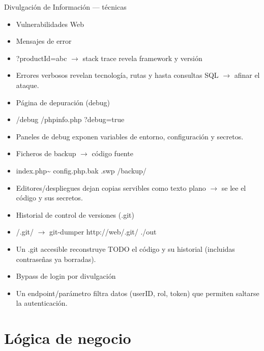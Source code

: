 \documentclass[aspectratio=169,10pt]{beamer}
\begin{document}
\begin{frame}[allowframebreaks]{Divulgación de Información --- técnicas}
\small
  \begin{itemize}
  \item Vulnerabilidades Web
  \item Mensajes de error
  \item ?productId=abc $\rightarrow$ stack trace revela framework y versión
  \item Errores verbosos revelan tecnología, rutas y hasta consultas SQL $\rightarrow$ afinar el ataque.
  \item Página de depuración (debug)
  \item /debug /phpinfo.php ?debug=true
  \item Paneles de debug exponen variables de entorno, configuración y secretos.
  \item Ficheros de backup $\rightarrow$ código fuente
  \item index.php\textasciitilde{} config.php.bak .swp /backup/
  \item Editores/despliegues dejan copias servibles como texto plano $\rightarrow$ se lee el código y sus secretos.
  \item Historial de control de versiones (.git)
  \item /.git/ $\rightarrow$ git-dumper http://web/.git/ ./out
  \item Un .git accesible reconstruye TODO el código y su historial (incluidas contraseñas ya borradas).
  \item Bypass de login por divulgación
  \item Un endpoint/parámetro filtra datos (userID, rol, token) que permiten saltarse la autenticación.
  \end{itemize}
\end{frame}

\section{Lógica de negocio}
\end{document}
